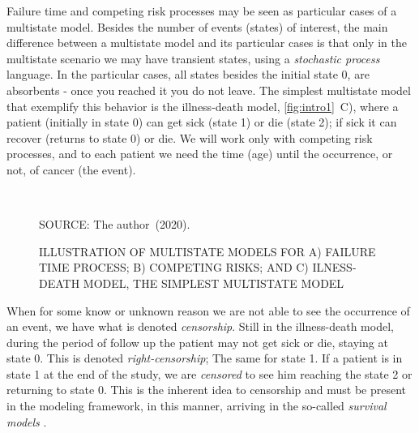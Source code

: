 Failure time and competing risk processes may be seen as particular
cases of a multistate model. Besides the number of events (states) of
interest, the main difference between a multistate model and its
particular cases is that only in the multistate scenario we may have
transient states, using a \textit{stochastic process} language. In the
particular cases, all states besides the initial state 0, are absorbents
- once you reached it you do not leave. The simplest multistate model
that exemplify this behavior is the illness-death model,
\autoref{fig:intro1}~C), where a patient (initially in state 0) can get
sick (state 1) or die (state 2); if sick it can recover (returns to
state 0) or die. We will work only with competing risk processes, and
to each patient we need the time (age) until the occurrence, or not, of
cancer (the event).

\begin{figure}[H]
  \setlength{\abovecaptionskip}{.0001pt}
  \caption{ILLUSTRATION OF MULTISTATE MODELS FOR A) FAILURE TIME
    PROCESS; B) COMPETING RISKS; AND C) ILNESS-DEATH MODEL, THE SIMPLEST
    MULTISTATE MODEL}
  \vspace{0.5cm} \centering
  \\
  \vspace{0.5cm}
  \begin{footnotesize}
    SOURCE: The author~(2020).
  \end{footnotesize}
  \label{fig:intro1}
\end{figure}

When for some know or unknown reason we are not able to see the
occurrence of an event, we have what is denoted \textit{censorship}.
Still in the illness-death model, during the period of follow up the
patient may not get sick or die, staying at state 0. This is denoted
\textit{right-censorship}; The same for state 1. If a patient is in
state 1 at the end of the study, we are \textit{censored} to see him
reaching the state 2 or returning to state 0. This is the inherent idea
to censorship and must be present in the modeling framework, in this
manner, arriving in the so-called \textit{survival models}
\cite{kalb&prentice}.

